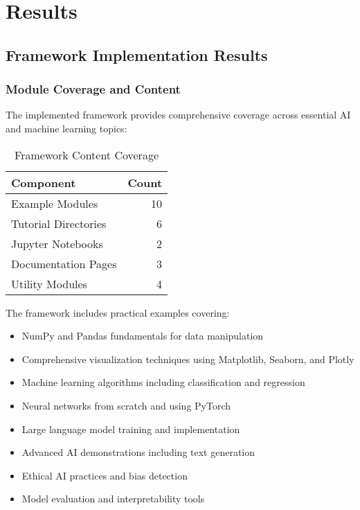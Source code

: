 \section{Results}
\label{sec:results}

\subsection{Framework Implementation Results}

\subsubsection{Module Coverage and Content}

The implemented framework provides comprehensive coverage across essential AI and machine learning topics:

\begin{table}[H]
\centering
\caption{Framework Content Coverage}
\label{tab:content-coverage}
\begin{tabular}{@{}lr@{}}
\toprule
\textbf{Component} & \textbf{Count} \\
\midrule
Example Modules & 10 \\
Tutorial Directories & 6 \\
Jupyter Notebooks & 2 \\
Documentation Pages & 3 \\
Utility Modules & 4 \\
\bottomrule
\end{tabular}
\end{table}

The framework includes practical examples covering:
\begin{itemize}
    \item NumPy and Pandas fundamentals for data manipulation
    \item Comprehensive visualization techniques using Matplotlib, Seaborn, and Plotly
    \item Machine learning algorithms including classification and regression
    \item Neural networks from scratch and using PyTorch
    \item Large language model training and implementation
    \item Advanced AI demonstrations including text generation
    \item Ethical AI practices and bias detection
    \item Model evaluation and interpretability tools
\end{itemize}


